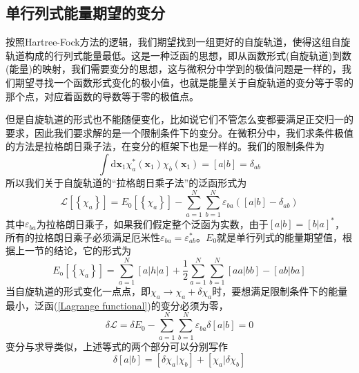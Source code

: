 \documentclass[12pt,a4paper,openany,twoside]{book}
\numberwithin{equation}{section}
\begin{document}
        \subsection{单行列式能量期望的变分}
          按照Hartree-Fock方法的逻辑，我们期望找到一组更好的自旋轨道，使得这组自旋轨道构成的行列式能量最低。这是一种泛函的思想，即从函数形式(自旋轨道)到数(能量)的映射，我们需要变分的思想，这与微积分中学到的极值问题是一样的，我们期望寻找一个函数形式变化的极小值，也就是能量关于自旋轨道的变分等于零的那个点，对应着函数的导数等于零的极值点。

          但是自旋轨道的形式也不能随便变化，比如说它们不管怎么变都要满足正交归一的要求，因此我们要求解的是一个限制条件下的变分。在微积分中，我们求条件极值的方法是拉格朗日乘子法，在变分的框架下也是一样的。我们的限制条件为
          \begin{equation}
            \int \mathrm{d} \mathbf{x}_{1} \chi_{a}^{*}(\mathbf{x}_{1}) \chi_{b}(\mathbf{x}_{1})=[a | b]=\delta_{a b}
          \end{equation}
          所以我们关于自旋轨道的“拉格朗日乘子法”的泛函形式为
          \begin{equation}
            \mathscr{L}\left[\left\{\chi_{a}\right\}\right]=E_{0}\left[\left\{\chi_{a}\right\}\right]-\sum_{a=1}^{N} \sum_{b=1}^{N} \varepsilon_{b a}\left([a | b]-\delta_{a b}\right)
            \label{Lagrange functional}
          \end{equation}
          其中$\varepsilon_{b a}$为拉格朗日乘子，如果我们假定整个泛函为实数，由于$[a | b]=[b | a]^{*}$，所有的拉格朗日乘子必须满足厄米性$\varepsilon_{b a}=\varepsilon_{a b}^{*}$。$E_0$就是单行列式的能量期望值，根据上一节的结论，它的形式为
          \begin{equation}
            E_{\mathrm{o}}\left[\left\{\chi_{a}\right\}\right]=\sum_{a=1}^{N}[a|h| a]+\frac{1}{2} \sum_{a=1}^{N} \sum_{b=1}^{N}[a a | b b]-[a b | b a]
          \end{equation}
          当自旋轨道的形式变化一点点，即$\chi_{a} \rightarrow \chi_{a}+\delta \chi_{a}$时，要想满足限制条件下的能量最小，泛函(\ref{Lagrange functional})的变分必须为零，
          \begin{equation}
            \delta \mathscr{L}=\delta E_{0}-\sum_{a=1}^{N} \sum_{b=1}^{N} \varepsilon_{b a} \delta[a | b]=0
          \end{equation}
          变分与求导类似，上述等式的两个部分可以分别写作
          \begin{equation}
            \delta[a | b]=\left[\delta \chi_{a} | \chi_{b}\right]+\left[\chi_{a} | \delta \chi_{b}\right]
            \label{overlap variation}
          \end{equation}
\end{document}
